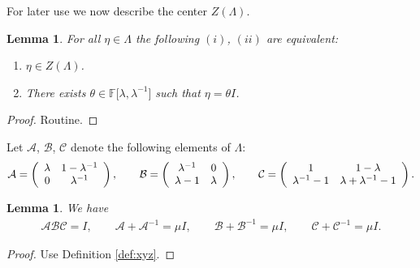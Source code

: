 \documentclass[10pt,a4paper]{amsart}
\numberwithin{equation}{section}
\newtheorem{Lemma}[Theorem]{Lemma}
\begin{document}
For later use we now describe the center $Z(\Lambda)$.{\samepage
\begin{Lemma}
\label{lem:zh}
For all $\eta \in \Lambda $ the following
$(i)$, $(ii)$
are equivalent:
\begin{enumerate}\itemsep=0pt
\item[$(i)$] $\eta  \in Z(\Lambda)$.
\item[$(ii)$] There exists $\theta \in
 \mathbb F\lbrack \lambda, \lambda^{-1} \rbrack $ such that $\eta=\theta I$.
\end{enumerate}
\end{Lemma}

\begin{proof}
Routine.
\end{proof}}



\begin{Definition}
\label{def:xyz}
Let $ \mathcal A$, $\mathcal B$, $\mathcal C$ denote the following elements of
$\Lambda $:
\begin{gather*}
 \mathcal A =
\left(
\begin{array}{  c c}
\lambda & 1-\lambda^{-1}   \\
0 & \lambda^{-1}
\end{array}
\right),
\qquad
\mathcal B =
\left(
\begin{array}{  c c}
\lambda^{-1} &  0 \\
\lambda-1 & \lambda
\end{array}
\right),
 \qquad \mathcal C =
\left(
\begin{array}{  c c}
1 &  1-\lambda \\
\lambda^{-1}-1 & \lambda+ \lambda^{-1}-1
\end{array}
\right).
\end{gather*}
\end{Definition}


\begin{Lemma}
\label{lem:xyz}
We have
\begin{gather*}
\mathcal A \mathcal B\mathcal C=I, \qquad
\mathcal A+{\mathcal A}^{-1}=\mu I,
\qquad
\mathcal B+{\mathcal B}^{-1}=\mu I,
\qquad
\mathcal C+{\mathcal C}^{-1}=\mu I.
\end{gather*}
\end{Lemma}

\begin{proof}
Use Def\/inition
\ref{def:xyz}.
\end{proof}
\end{document}
